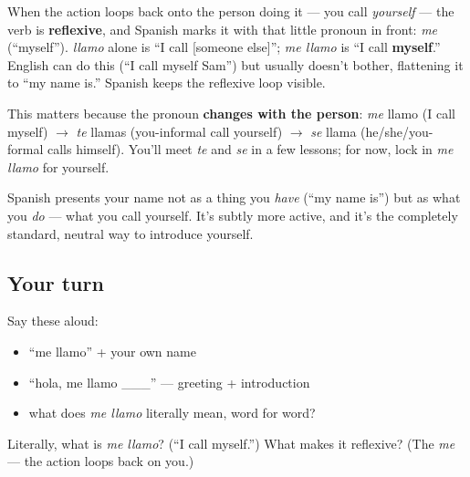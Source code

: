 \begin{grammarlens}[title={Grammar Lens: reflexive verbs}]
When the action loops back onto the person doing it — you call \emph{yourself} — the verb is \textbf{reflexive}, and Spanish marks it with that little pronoun in front: \emph{me} (\textquotedblleft{}myself\textquotedblright{}). \emph{llamo} alone is \textquotedblleft{}I call {[}someone else{]}\textquotedblright{}; \emph{me llamo} is \textquotedblleft{}I call \textbf{myself}.\textquotedblright{} English can do this (\textquotedblleft{}I call myself Sam\textquotedblright{}) but usually doesn't bother, flattening it to \textquotedblleft{}my name is.\textquotedblright{} Spanish keeps the reflexive loop visible.

This matters because the pronoun \textbf{changes with the person}: \emph{me} llamo (I call myself) $\to$ \emph{te} llamas (you-informal call yourself) $\to$ \emph{se} llama (he/she/you-formal calls himself). You'll meet \emph{te} and \emph{se} in a few lessons; for now, lock in \emph{me llamo} for yourself.
\end{grammarlens}

\begin{culture}
Spanish presents your name not as a thing you \emph{have} (\textquotedblleft{}my name is\textquotedblright{}) but as what you \emph{do} — what you call yourself. It's subtly more active, and it's the completely standard, neutral way to introduce yourself.
\end{culture}

\subsection*{Your turn}
Say these aloud:

\begin{itemize}
\raggedright
  \item \textquotedblleft{}me llamo\textquotedblright{} + your own name
  \item \textquotedblleft{}hola, me llamo \_\_\_\textquotedblright{} — greeting + introduction
  \item what does \emph{me llamo} literally mean, word for word?
\end{itemize}

\begin{tcolorbox}[breakable,colback=teal!4,colframe=teal!35!black,title={Before you move on}]
Literally, what is \emph{me llamo}? (\textquotedblleft{}I call myself.\textquotedblright{}) What makes it reflexive? (The \emph{me} — the action loops back on you.)
\end{tcolorbox}
